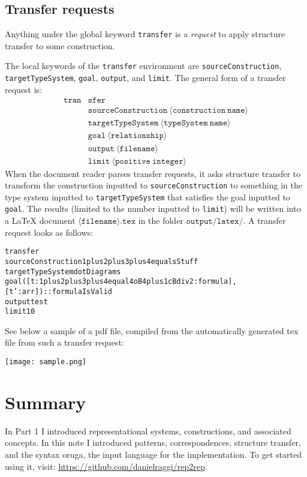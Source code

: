 \documentclass[a4paper]{article}
\theoremstyle{definition}
\begin{document}
	\subsection{Transfer requests}
	Anything under the global keyword \texttt{transfer} is a \textit{request} to apply structure transfer to some construction.
	
	The local keywords of the \texttt{transfer} environment are \texttt{sourceConstruction}, \texttt{targetTypeSystem}, \texttt{goal}, \texttt{output}, and \texttt{limit}. The general form of a transfer request is:
	\begin{align*}
	\mathtt{tran}& \mathtt{sfer}\\[-3pt]
	& \mathtt{sourceConstruction\ \langle construction\ name \rangle}\\[-3pt]
	& \mathtt{targetTypeSystem\  \langle typeSystem\ name \rangle}\\[-3pt]
	& \mathtt{goal\  \langle relationship \rangle}\\[-3pt]
	& \mathtt{output\  \langle filename \rangle}\\[-3pt]
	& \mathtt{limit\  \langle positive\ integer \rangle}
	\end{align*}
	When the document reader parses transfer requests, it asks structure transfer to transform the construction inputted to \texttt{sourceConstruction} to something in the type system inputted to \texttt{targetTypeSystem} that satisfies the goal inputted to \texttt{goal}. The results (limited to the number inputted to \texttt{limit}) will be written into a LaTeX document $\mathtt{\langle filename \rangle.tex}$ in the folder $\mathtt{output/latex/}$. A transfer request looks as follows:
\begin{alltt}
transfer
    sourceConstruction 1plus2plus3plus4equalsStuff
    targetTypeSystem dotDiagrams
    goal ([t:1plus2plus3plus4equal4oB4plus1cBdiv2:formula],[t':arr]) :: formulaIsValid
    output test
    limit 10
\end{alltt}
	See below a sample of a pdf file, compiled from the automatically generated tex file from such a transfer request:
	\begin{center}
		\texttt{[image: sample.png]}
	\end{center}
	
\section{Summary}
In Part 1 I introduced representational systems, constructions, and associated concepts. In this note I introduced patterns, correspondences, structure transfer, and the syntax oruga, the input language for the implementation. To get started using it, visit: \url{https://github.com/danielraggi/rep2rep}.
	
\end{document}
